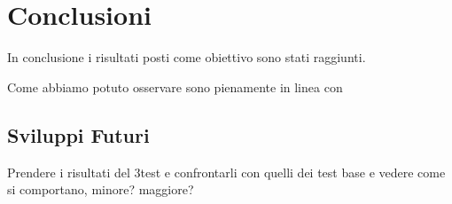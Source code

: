 \section{Conclusioni}
\label{section:conclusioni}

In conclusione i risultati posti come obiettivo sono
stati raggiunti.

Come abbiamo potuto osservare sono pienamente in linea con 


\subsection{Sviluppi Futuri}


Prendere i risultati del 3\degree test e confrontarli con quelli dei test base e vedere come si comportano, minore? maggiore?